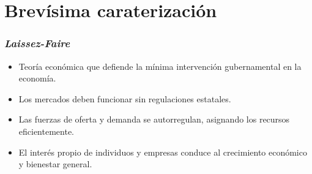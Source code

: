 \documentclass{beamer}
\begin{document}


\section{Brevísima caraterización}



\begin{frame}
\frametitle{\emph{Laissez-Faire}}
\begin{itemize}
\pause
    \item Teoría económica que defiende la mínima intervención gubernamental en la economía.
    \pause
    \item Los mercados deben funcionar sin regulaciones estatales.
    \pause
    \item Las fuerzas de oferta y demanda se autorregulan, asignando los recursos eficientemente.
    \pause
    \item El interés propio de individuos y empresas conduce al crecimiento económico y bienestar general.
\end{itemize}
\end{frame}
\end{document}
